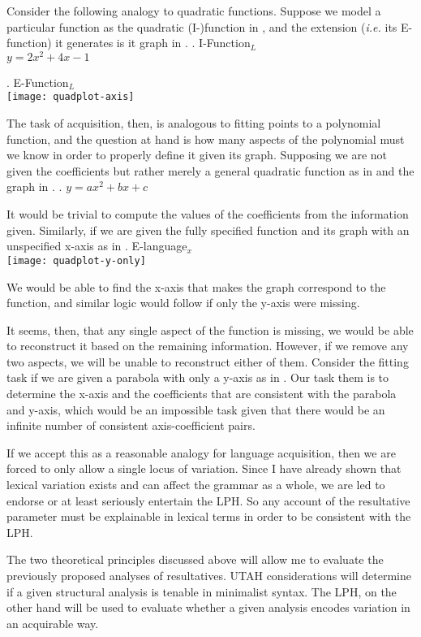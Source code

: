 \documentclass[MilwayThesis]{subfiles}
\begin{document}
Consider the following analogy to quadratic functions.
Suppose we model a particular function as the quadratic (I-)function in \Next, and the extension (\textit{i.e.} its E-function) it generates is it graph in \NNext.
\ex. I-Function$_L$\\
$y = 2x^2 + 4x-1$

\ex. E-Function$_L$\\
\texttt{[image: quadplot-axis]}

The task of acquisition, then, is analogous to fitting points to a polynomial function, and the question at hand is how many aspects of the polynomial must we know in order to properly define it given its graph.
Supposing we are not given the coefficients but rather merely a general quadratic function as in \Next and the graph in \Last.
\ex. $y = ax^2 + bx + c$

It would be trivial to compute the values of the coefficients from the information given.
Similarly, if we are given the fully specified function and its graph with an unspecified x-axis as in \Next
\ex. E-language$_x$\\ 
\texttt{[image: quadplot-y-only]}

We would be able to find the x-axis that makes the graph correspond to the function, and similar logic would follow if only the y-axis were missing.

It seems, then, that any single aspect of the function is missing, we would be able to reconstruct it based on the remaining information.
However, if we remove any two aspects, we will be unable to reconstruct either of them. 
Consider the fitting task if we are given a parabola with only a y-axis as in \Last.
Our task them is to determine the x-axis and the coefficients that are consistent with the parabola and y-axis, which would be an impossible task given that there would be an infinite number of consistent axis-coefficient pairs.

If we accept this as a reasonable analogy for language acquisition, then we are forced to only allow a single locus of variation.
Since I have already shown that lexical variation exists and can affect the grammar as a whole, we are led to endorse or at least seriously entertain the LPH.
So any account of the resultative parameter must be explainable in lexical terms in order to be consistent with the LPH.

The two theoretical principles discussed above will allow me to evaluate the previously proposed analyses of resultatives.
UTAH considerations will determine if a given structural analysis is tenable in minimalist syntax.
The LPH, on the other hand will be used to evaluate whether a given analysis encodes variation in an acquirable way.
\end{document}
